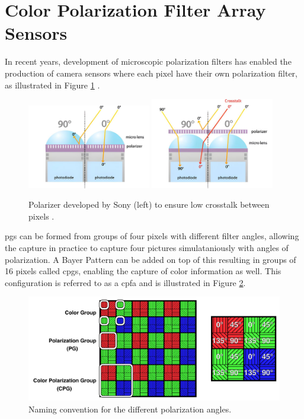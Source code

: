 \section{Color Polarization Filter Array Sensors}
In recent years, development of microscopic polarization filters has enabled the production of camera sensors where each pixel have their own polarization filter, as illustrated in Figure \ref{fig:camera_crosstalk} \cite{lucidvisionlabsLUCIDGoingPolarizedWhitePaper2018}.
\begin{figure}[H]
    \centering
    \includegraphics[width=0.48\textwidth]{figures/crosstalk_off_upscaled.jpg}
    \includegraphics[width=0.48\textwidth]{figures/crosstalk_upscaled.jpg}
    \caption{Polarizer developed by Sony (left) to ensure low crosstalk between pixels \cite{lucidvisionlabsPolarizationExplainedSony2018}.}
    \label{fig:camera_crosstalk}
\end{figure}
\glspl{pg} can be formed from groups of four pixels with different filter angles, allowing the capture in practice to capture four pictures simulataniously with angles of polarization.
A Bayer Pattern can be added on top of this resulting in groups of 16 pixels called \glspl{cpg}, enabling the capture of color information as well.
This configuration is referred to as a \gls{cpfa} and is illustrated in Figure \ref{fig:polarization_naming}.

\begin{figure}[H]
    \centering
    \includegraphics[width=\textwidth]{figures/polarized_image/naming.pdf}
    \caption{Naming convention for the different polarization angles.}
    \label{fig:polarization_naming}
\end{figure}

